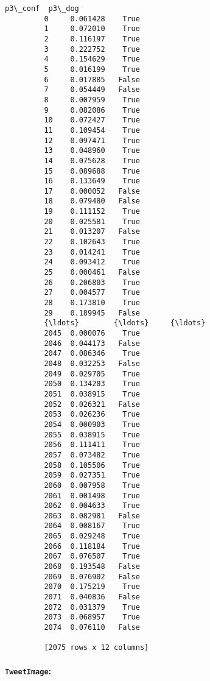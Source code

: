 \documentclass[11pt]{article}
\begin{document}
\begin{Verbatim}[commandchars=\\\{\}]
                p3\_conf  p3\_dog  
         0     0.061428    True  
         1     0.072010    True  
         2     0.116197    True  
         3     0.222752    True  
         4     0.154629    True  
         5     0.016199    True  
         6     0.017885   False  
         7     0.054449   False  
         8     0.007959    True  
         9     0.082086    True  
         10    0.072427    True  
         11    0.109454    True  
         12    0.097471    True  
         13    0.048960    True  
         14    0.075628    True  
         15    0.089688    True  
         16    0.133649    True  
         17    0.000052   False  
         18    0.079480   False  
         19    0.111152    True  
         20    0.025581    True  
         21    0.013207   False  
         22    0.102643    True  
         23    0.014241    True  
         24    0.093412    True  
         25    0.000461   False  
         26    0.206803    True  
         27    0.004577    True  
         28    0.173810    True  
         29    0.189945   False  
         {\ldots}        {\ldots}     {\ldots}  
         2045  0.000076    True  
         2046  0.044173   False  
         2047  0.086346    True  
         2048  0.032253   False  
         2049  0.029705    True  
         2050  0.134203    True  
         2051  0.038915    True  
         2052  0.026321   False  
         2053  0.026236    True  
         2054  0.000903    True  
         2055  0.038915    True  
         2056  0.111411    True  
         2057  0.073482    True  
         2058  0.105506    True  
         2059  0.027351    True  
         2060  0.007958    True  
         2061  0.001498    True  
         2062  0.004633    True  
         2063  0.082981   False  
         2064  0.008167    True  
         2065  0.029248    True  
         2066  0.118184    True  
         2067  0.076507    True  
         2068  0.193548   False  
         2069  0.076902   False  
         2070  0.175219    True  
         2071  0.040836   False  
         2072  0.031379    True  
         2073  0.068957    True  
         2074  0.076110   False  
         
         [2075 rows x 12 columns]
\end{Verbatim}
            
    \hypertarget{tweetimage}{%
\paragraph{\texorpdfstring{\texttt{TweetImage}:}{TweetImage:}}\label{tweetimage}}
\end{document}
